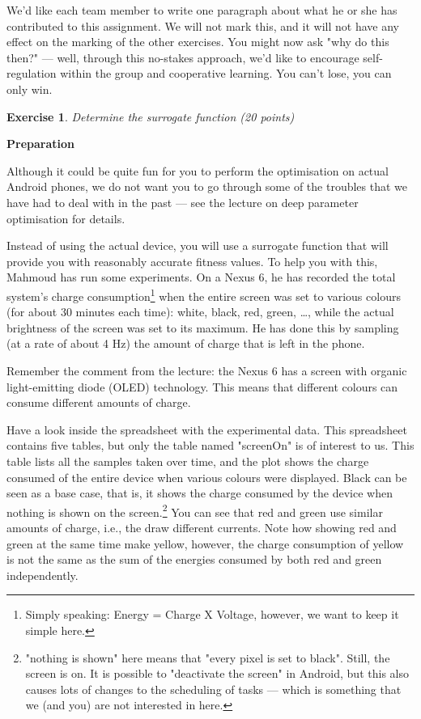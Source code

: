 \documentclass{pracs}
\newtheorem{exercise}{Exercise}
\begin{document}
We'd like each team member to write one paragraph about what he or she has contributed to this assignment. We will not mark this, and it will not have any effect on the marking of the other exercises. You might now ask "why do this then?" --- well, through this no-stakes approach, we'd like to encourage self-regulation within the group and cooperative learning. You can't lose, you can only win.


\begin{exercise}
Determine the surrogate function (20 points)
\end{exercise}

\textbf{Preparation}

Although it could be quite fun for you to perform the optimisation on actual Android phones, we do not want you to go through some of the troubles that we have had to deal with in the past --- see the lecture on deep parameter optimisation for details.

Instead of using the actual device, you will use a surrogate function that will provide you with reasonably accurate fitness values. To help you with this, Mahmoud has run some experiments. On a Nexus 6, he has recorded the total system's charge consumption\footnote{Simply speaking: Energy = Charge X Voltage, however, we want to keep it simple here.} when the entire screen was set to various colours (for about 30 minutes each time): white, black, red, green, \ldots, while the actual brightness of the screen was set to its maximum. He has done this by sampling (at a rate of about 4 Hz) the amount of charge that is left in the phone.

Remember the comment from the lecture: the Nexus 6 has a screen with organic light-emitting diode (OLED) technology. This means that different colours can consume different amounts of charge.

Have a look inside the spreadsheet with the experimental data. This spreadsheet contains five tables, but only the table named "screenOn" is of interest to us. This table lists all the samples taken over time, and the plot shows the charge consumed of the entire device when various colours were displayed. 
Black can be seen as a base case, that is, it shows the charge consumed by the device when nothing is shown on the screen.\footnote{"nothing is shown" here means that "every pixel is set to black". Still, the screen is on. It is possible to  "deactivate the screen" in Android, but this also causes lots of changes to the scheduling of tasks --- which is something that we (and you) are not interested in here.} 
You can see that red and green use similar amounts of charge, i.e., the draw different currents. Note how showing red and green at the same time make yellow, however, the charge consumption of yellow is not the same as the sum of the energies consumed by both red and green independently.
\end{document}
